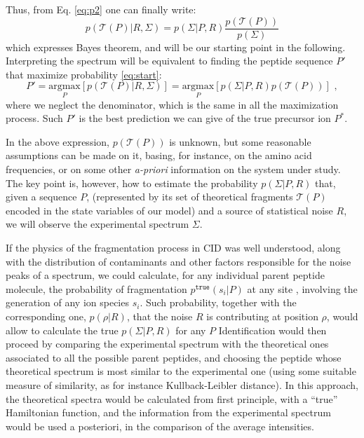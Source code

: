 Thus, %
from Eq. \ref{eq:p2} one can finally write:
\begin{equation}
p(\mathcal T(P)\vert R ,\Sigma)=
p(\Sigma\vert P,R)
\frac{p(\mathcal T(P))}{p(\Sigma)}
\label{eq:start}
\end{equation}
which expresses Bayes theorem, and will be our starting point in the following. 
Interpreting the spectrum will be equivalent to finding the peptide
sequence $P'$ that maximize probability \ref{eq:start}:
\begin{equation}
P'=\underset{P}{\text{argmax}}[p(\mathcal T(P)\vert R,\Sigma)]=
\underset{P}{\text{argmax}}[p(\Sigma|P,R)p(\mathcal T(P))]\,\,,
\label{eq:bestP}
\end{equation}
where we neglect the denominator, which is the same in all the maximization
process. Such $P'$ is the best prediction we can give of the true precursor ion
$P^*$.

In the above expression, $p(\mathcal T(P))$ is unknown, but some reasonable
assumptions can be made on it, basing, for instance, on the amino acid
frequencies, or on some other \emph{a-priori} information on the system under study.
The key point is, however, how to estimate the probability $p(\Sigma \vert P,
R)$ that, given a sequence $P$, (represented by its set of theoretical fragments
$\mathcal T(P)$ encoded in the state variables of our model) and a source of
statistical noise $R$, we will observe the experimental spectrum $\Sigma$.

If the physics of the fragmentation process in CID was well understood, along
with the distribution of contaminants and other factors responsible for the
noise peaks of a spectrum, we could calculate,  for any individual parent
peptide molecule, the probability of fragmentation $p^{\texttt{true}}(s_i|P)$
at any site , involving the generation of any ion species $s_i$. Such
probability, together with the corresponding one, $p(\rho|R)$, that the noise
$R$ is contributing at position $\rho$,  would allow to calculate the true
$p(\Sigma \vert P, R)$ for any $P$
Identification would then proceed by comparing the experimental spectrum with
the theoretical ones associated to all the possible parent peptides, and
choosing the peptide whose theoretical spectrum is most similar to the
experimental one (using some suitable measure of similarity, as for instance
Kullback-Leibler distance). In this approach, the theoretical spectra would be
calculated from first principle, with a ``true'' Hamiltonian function, and the
information from the experimental spectrum would be used a posteriori, in the
comparison of the average intensities.

